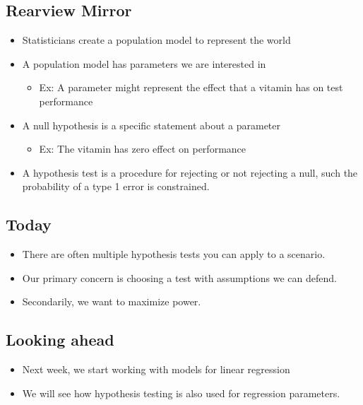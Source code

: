 \documentclass[
  letterpaper,
  DIV=11,
  numbers=noendperiod]{scrreprt}
\providecommand{\tightlist}{%
  \setlength{\itemsep}{0pt}\setlength{\parskip}{0pt}}\usepackage{longtable,booktabs,array}
\begin{document}
\subsection{Rearview Mirror}\label{rearview-mirror-1}

\begin{itemize}
\tightlist
\item
  Statisticians create a population model to represent the world
\item
  A population model has parameters we are interested in

  \begin{itemize}
  \tightlist
  \item
    Ex: A parameter might represent the effect that a vitamin has on
    test performance
  \end{itemize}
\item
  A null hypothesis is a specific statement about a parameter

  \begin{itemize}
  \tightlist
  \item
    Ex: The vitamin has zero effect on performance
  \end{itemize}
\item
  A hypothesis test is a procedure for rejecting or not rejecting a
  null, such the probability of a type 1 error is constrained.
\end{itemize}

\subsection{Today}\label{today}

\begin{itemize}
\tightlist
\item
  There are often multiple hypothesis tests you can apply to a scenario.
\item
  Our primary concern is choosing a test with assumptions we can defend.
\item
  Secondarily, we want to maximize power.
\end{itemize}

\subsection{Looking ahead}\label{looking-ahead}

\begin{itemize}
\tightlist
\item
  Next week, we start working with models for linear regression
\item
  We will see how hypothesis testing is also used for regression
  parameters.
\end{itemize}
\end{document}
